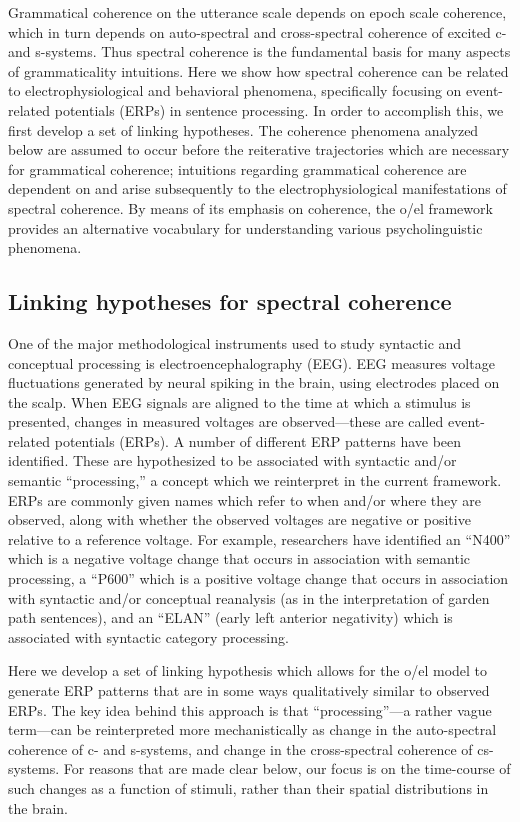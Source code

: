 Grammatical coherence on the utterance scale depends on epoch scale coherence, which in turn depends on auto-spectral and cross-spectral coherence of excited c- and s-systems. Thus spectral coherence is the fundamental basis for many aspects of grammaticality intuitions. Here we show how spectral coherence can be related to electrophysiological and behavioral phenomena, specifically focusing on event-related potentials (ERPs) in sentence processing. In order to accomplish this, we first develop a set of linking hypotheses. The coherence phenomena analyzed below are assumed to occur before the reiterative trajectories which are necessary for grammatical coherence; intuitions regarding grammatical coherence are dependent on and arise subsequently to the electrophysiological manifestations of spectral coherence. By means of its emphasis on coherence, the o/el framework provides an alternative vocabulary for understanding various psycholinguistic phenomena.

\subsection{Linking hypotheses for spectral coherence}

One of the major methodological instruments used to study syntactic and conceptual processing is electroencephalography (EEG). EEG measures voltage fluctuations generated by neural spiking in the brain, using electrodes placed on the scalp. When EEG signals are aligned to the time at which a stimulus is presented, changes in measured voltages are observed—these are called event-related potentials (ERPs). A number of different ERP patterns have been identified. These are hypothesized to be associated with syntactic and/or semantic “processing,” a concept which we reinterpret in the current framework. ERPs are commonly given names which refer to when and/or where they are observed, along with whether the observed voltages are negative or positive relative to a reference voltage. For example, researchers have identified an “N400” which is a negative voltage change that occurs in association with semantic processing, a “P600” which is a positive voltage change that occurs in association with syntactic and/or conceptual reanalysis (as in the interpretation of garden path sentences), and an “ELAN” (early left anterior negativity) which is associated with syntactic category processing. 

Here we develop a set of linking hypothesis which allows for the o/el model to generate ERP patterns that are in some ways qualitatively similar to observed ERPs. The key idea behind this approach is that “processing”—a rather vague term—can be reinterpreted more mechanistically as change in the auto-spectral coherence of c- and s-systems, and change in the cross-spectral coherence of cs-systems. For reasons that are made clear below, our focus is on the time-course of such changes as a function of stimuli, rather than their spatial distributions in the brain.


